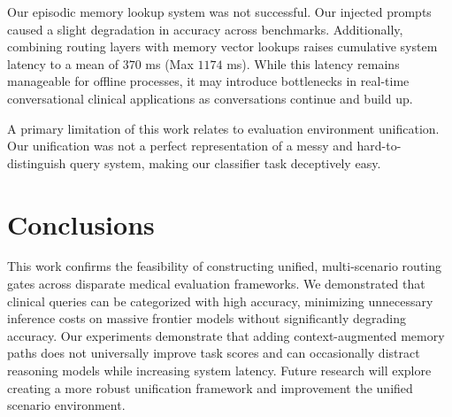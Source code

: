\documentclass[conference]{IEEEtran}
\begin{document}
Our episodic memory lookup system was not successful. Our injected prompts caused a slight degradation in accuracy across benchmarks. Additionally, combining routing layers with memory vector lookups raises cumulative system latency to a mean of $370$ ms (Max $1174$ ms). While this latency remains manageable for offline processes, it may introduce bottlenecks in real-time conversational clinical applications as conversations continue and build up.

A primary limitation of this work relates to evaluation environment unification. Our unification was not a perfect representation of a messy and hard-to-distinguish query system, making our classifier task deceptively easy. 

\section{Conclusions}

This work confirms the feasibility of constructing unified, multi-scenario routing gates across disparate medical evaluation frameworks. We demonstrated that clinical queries can be categorized with high accuracy, minimizing unnecessary inference costs on massive frontier models without significantly degrading accuracy. Our experiments demonstrate that adding context-augmented memory paths does not universally improve task scores and can occasionally distract reasoning models while increasing system latency. Future research will explore creating a more robust unification framework and improvement the unified scenario environment.



\end{document}
